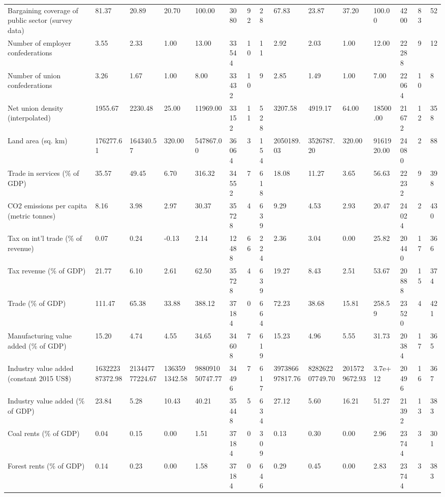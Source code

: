 \begin{longtable}{lllllllllllllll}
\addlinespace
Bargaining coverage of public sector (survey data) & 81.37 & 20.89 & 20.70 & 100.00 & 3080 & 92 & 28 & 67.83 & 23.87 & 37.20 & 100.00 & 4200 & 83 & 52\\
Number of employer confederations & 3.55 & 2.33 & 1.00 & 13.00 & 33544 & 10 & 11 & 2.92 & 2.03 & 1.00 & 12.00 & 22288 & 9 & 12\\
Number of union confederations & 3.26 & 1.67 & 1.00 & 8.00 & 33432 & 10 & 9 & 2.85 & 1.49 & 1.00 & 7.00 & 22064 & 10 & 8\\
Net union density (interpolated) & 1955.67 & 2230.48 & 25.00 & 11969.00 & 33152 & 11 & 528 & 3207.58 & 4919.17 & 64.00 & 18500.00 & 21672 & 12 & 358\\
Land area (sq. km) & 176277.61 & 164340.57 & 320.00 & 547867.00 & 36064 & 3 & 154 & 2050189.03 & 3526787.20 & 320.00 & 9161920.00 & 24080 & 2 & 88\\
\addlinespace
Trade in services (\% of GDP) & 35.57 & 49.45 & 6.70 & 316.32 & 34552 & 7 & 618 & 18.08 & 11.27 & 3.65 & 56.63 & 22232 & 9 & 398\\
CO2 emissions per capita (metric tonnes) & 8.16 & 3.98 & 2.97 & 30.37 & 35728 & 4 & 639 & 9.29 & 4.53 & 2.93 & 20.47 & 24024 & 2 & 430\\
Tax on int'l trade (\% of revenue) & 0.07 & 0.24 & -0.13 & 2.14 & 12488 & 66 & 224 & 2.36 & 3.04 & 0.00 & 25.82 & 20440 & 17 & 366\\
Tax revenue (\% of GDP) & 21.77 & 6.10 & 2.61 & 62.50 & 35728 & 4 & 639 & 19.27 & 8.43 & 2.51 & 53.67 & 20888 & 15 & 374\\
Trade (\% of GDP) & 111.47 & 65.38 & 33.88 & 388.12 & 37184 & 0 & 664 & 72.23 & 38.68 & 15.81 & 258.59 & 23520 & 4 & 421\\
\addlinespace
Manufacturing value added (\% of GDP) & 15.20 & 4.74 & 4.55 & 34.65 & 34608 & 7 & 619 & 15.23 & 4.96 & 5.55 & 31.73 & 20384 & 17 & 365\\
Industry value added (constant 2015 US\$) & 163222387372.98 & 213447777224.67 & 1363591342.58 & 988091050747.77 & 34496 & 7 & 617 & 397386697817.76 & 828262207749.70 & 2015729672.93 & 3.7e+12 & 20496 & 16 & 367\\
Industry value added (\% of GDP) & 23.84 & 5.28 & 10.43 & 40.21 & 35448 & 5 & 634 & 27.12 & 5.60 & 16.21 & 51.27 & 21392 & 13 & 383\\
Coal rents (\% of GDP) & 0.04 & 0.15 & 0.00 & 1.51 & 37184 & 0 & 309 & 0.13 & 0.30 & 0.00 & 2.96 & 23744 & 3 & 301\\
Forest rents (\% of GDP) & 0.14 & 0.23 & 0.00 & 1.58 & 37184 & 0 & 646 & 0.29 & 0.45 & 0.00 & 2.83 & 23744 & 3 & 383\\

\end{longtable}
